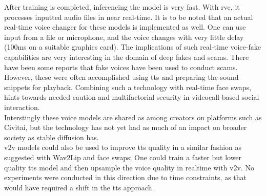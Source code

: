 \documentclass[
  a4paper,  %
  twoside,  %
  bibliography=totoc,
  headsepline,
  cleardoublepage=empty,
  parskip=half,
  draft=false
]{scrbook}
\begin{document}
After training is completed, inferencing the model is very fast. With \gls{rvc}, it processes inputted audio files in near real-time. It is to be noted that an actual real-time voice changer for these models is implemented as well\cite{WokadaVoicechangerVoice}. One can use input from a file or microphone, and the voice changes with very little delay (100ms on a suitable graphics card). The implications of such real-time voice-fake capabilities are very interesting in the domain of deep fakes and scams. There have been some reports that fake voices have been used to conduct scams. However, these were often accomplished using \gls{tts} and preparing the sound snippets for playback. Combining such a technology with real-time face swaps, hints towards needed caution and multifactorial security in videocall-based social interaction. \\
Interstingly these voice models are shared as among creators on platforms such as Civitai, but the technology has not yet had as much of an impact on broader society as stable diffusion has. \\
\gls{v2v} models could also be used to improve \gls{tts} quality in a similar fashion as suggested with Wav2Lip and face swaps; One could train a faster but lower quality \gls{tts} model and then upsample the voice quality in realtime with \gls{v2v}. No experiments were conducted in this direction due to time constraints, as that would have required a shift in the \gls{tts} approach.
\end{document}
